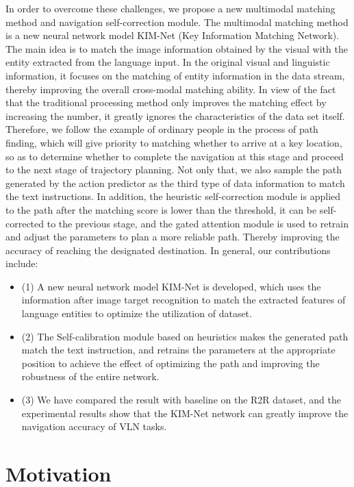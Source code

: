 In order to overcome these challenges, we propose a new multimodal matching method and navigation self-correction module. The multimodal matching method is a new neural network model KIM-Net (Key Information Matching Network). The main idea is to match the image information obtained by the visual with the entity extracted from the language input. In the original visual and linguistic information, it focuses on the matching of entity information in the data stream, thereby improving the overall cross-modal matching ability. In view of the fact that the traditional processing method only improves the matching effect by increasing the number, it greatly ignores the characteristics of the data set itself. Therefore, we follow the example of ordinary people in the process of path finding, which will give priority to matching whether to arrive at a key location, so as to determine whether to complete the navigation at this stage and proceed to the next stage of trajectory planning. Not only that, we also sample the path generated by the action predictor as the third type of data information to match the text instructions. In addition, the heuristic self-correction module is applied to the path after the matching score is lower than the threshold, it can be self-corrected to the previous stage, and the gated attention module is used to retrain and adjust the parameters to plan a more reliable path. Thereby improving the accuracy of reaching the designated destination. In general, our contributions include:

\begin{itemize}
		\item[](1) A new neural network model KIM-Net is developed, which uses the information after image target recognition to match the extracted features of language entities to optimize the utilization of dataset.
		\item[](2) The Self-calibration module based on heuristics makes the generated path match the text instruction, and retrains the parameters at the appropriate position to achieve the effect of optimizing the path and improving the robustness of the entire network.
		\item[](3) We have compared the result with baseline on the R2R dataset, and the experimental results show that the KIM-Net network can greatly improve the navigation accuracy of VLN tasks.
\end{itemize}
\section{Motivation}
	
